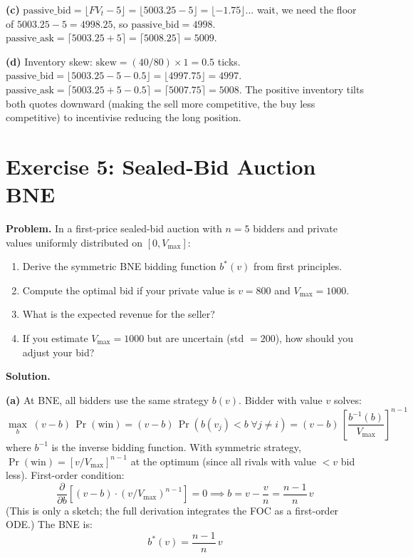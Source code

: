 \documentclass[12pt,a4paper,openany]{report}
\theoremstyle{definition}
\begin{document}
\textbf{(c)} $\text{passive\_bid} = \lfloor FV_t - 5 \rfloor = \lfloor 5003.25 - 5 \rfloor = \lfloor -1.75 \rfloor$... wait, we need the floor of $5003.25 - 5 = 4998.25$, so $\text{passive\_bid} = 4998$. $\text{passive\_ask} = \lceil 5003.25 + 5 \rceil = \lceil 5008.25 \rceil = 5009$.

\textbf{(d)} Inventory skew: $\text{skew} = (40/80) \times 1 = 0.5$ ticks. $\text{passive\_bid} = \lfloor 5003.25 - 5 - 0.5\rfloor = \lfloor 4997.75 \rfloor = 4997$. $\text{passive\_ask} = \lceil 5003.25 + 5 - 0.5\rceil = \lceil 5007.75\rceil = 5008$. The positive inventory tilts both quotes downward (making the sell more competitive, the buy less competitive) to incentivise reducing the long position.

\section*{Exercise 5: Sealed-Bid Auction BNE}

\textbf{Problem.} In a first-price sealed-bid auction with $n = 5$ bidders and private values uniformly distributed on $[0, V_{\max}]$:

\begin{enumerate}[label=(\alph*)]
  \item Derive the symmetric BNE bidding function $b^*(v)$ from first principles.
  \item Compute the optimal bid if your private value is $v = 800$ and $V_{\max} = 1000$.
  \item What is the expected revenue for the seller?
  \item If you estimate $V_{\max} = 1000$ but are uncertain (std $= 200$), how should you adjust your bid?
\end{enumerate}

\textbf{Solution.}

\textbf{(a)} At BNE, all bidders use the same strategy $b(v)$. Bidder with value $v$ solves:
\[
  \max_{b}\;(v - b)\,\Pr(\text{win}) = (v - b)\,\Pr(b(v_j) < b \;\forall j \neq i) = (v - b)\,\left[\frac{b^{-1}(b)}{V_{\max}}\right]^{n-1}
\]
where $b^{-1}$ is the inverse bidding function. With symmetric strategy, $\Pr(\text{win}) = [v/V_{\max}]^{n-1}$ at the optimum (since all rivals with value $< v$ bid less). First-order condition:
\[
  \frac{\partial}{\partial b}[(v-b)\cdot(v/V_{\max})^{n-1}] = 0 \implies b = v - \frac{v}{n} = \frac{n-1}{n}\,v
\]
(This is only a sketch; the full derivation integrates the FOC as a first-order ODE.) The BNE is:
\[
  b^*(v) = \frac{n-1}{n}\,v
\]
\end{document}
